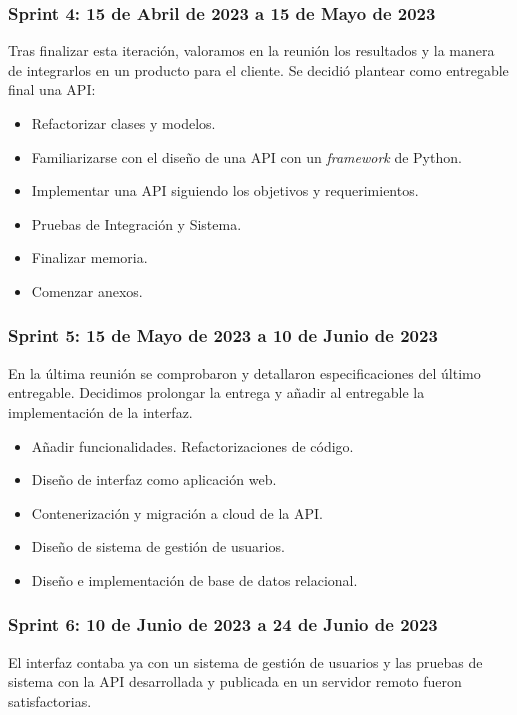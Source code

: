 \subsubsection{Sprint 4: 15 de Abril de 2023 a 15 de Mayo de 2023}

Tras finalizar esta iteración, valoramos en la reunión los resultados y la manera de integrarlos en un producto para el cliente.
Se decidió plantear como entregable final una API:

\begin{itemize}
    \item Refactorizar clases y modelos.
    \item Familiarizarse con el diseño de una API con un \textit{framework} de Python.
    \item Implementar una API siguiendo los objetivos y requerimientos.
    \item Pruebas de Integración y Sistema.
    \item Finalizar memoria. 
    \item Comenzar anexos.
\end{itemize}

\subsubsection{Sprint 5: 15 de Mayo de 2023 a 10 de Junio de 2023}

En la última reunión se comprobaron y detallaron especificaciones del último entregable. Decidimos prolongar la entrega y añadir al entregable la implementación de la interfaz.

\begin{itemize}
    \item Añadir funcionalidades. Refactorizaciones de código.
    \item Diseño de interfaz como aplicación web.
    \item Contenerización y migración a cloud de la API.
    \item Diseño de sistema de gestión de usuarios.
    \item Diseño e implementación de base de datos relacional.
\end{itemize}

\subsubsection{Sprint 6: 10 de Junio de 2023 a 24 de Junio de 2023}

El interfaz contaba ya con un sistema de gestión de usuarios y las pruebas de sistema con la API desarrollada y publicada en un servidor remoto fueron satisfactorias.

